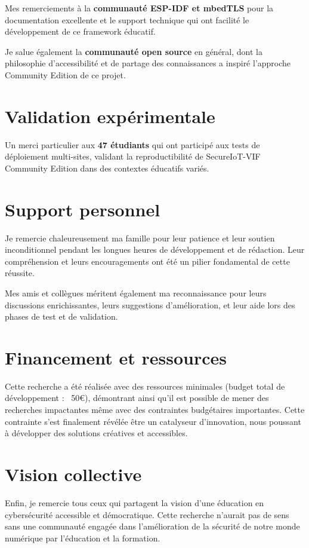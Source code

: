 Mes remerciements à la \textbf{communauté ESP-IDF et mbedTLS} pour la documentation excellente et le support technique qui ont facilité le développement de ce framework éducatif.

Je salue également la \textbf{communauté open source} en général, dont la philosophie d'accessibilité et de partage des connaissances a inspiré l'approche Community Edition de ce projet.

\section*{Validation expérimentale}

Un merci particulier aux \textbf{47 étudiants} qui ont participé aux tests de déploiement multi-sites, validant la reproductibilité de SecureIoT-VIF Community Edition dans des contextes éducatifs variés.

\section*{Support personnel}

Je remercie chaleureusement ma famille pour leur patience et leur soutien inconditionnel pendant les longues heures de développement et de rédaction. Leur compréhension et leurs encouragements ont été un pilier fondamental de cette réussite.

Mes amis et collègues méritent également ma reconnaissance pour leurs discussions enrichissantes, leurs suggestions d'amélioration, et leur aide lors des phases de test et de validation.

\section*{Financement et ressources}

Cette recherche a été réalisée avec des ressources minimales (budget total de développement : ~50€), démontrant ainsi qu'il est possible de mener des recherches impactantes même avec des contraintes budgétaires importantes. Cette contrainte s'est finalement révélée être un catalyseur d'innovation, nous poussant à développer des solutions créatives et accessibles.

\section*{Vision collective}

Enfin, je remercie tous ceux qui partagent la vision d'une éducation en cybersécurité accessible et démocratique. Cette recherche n'aurait pas de sens sans une communauté engagée dans l'amélioration de la sécurité de notre monde numérique par l'éducation et la formation.

